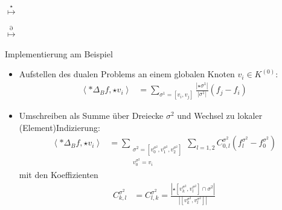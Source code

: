 \documentclass[handout]{beamer}
\begin{document}
\begin{frame}
\begin{overprint}
\begin{minipage}{0.4\textwidth}
            \centering 
          \end{minipage}\hfill
          {\Huge\(\overset{\star}{\longmapsto}\)}  \hfill
          \begin{minipage}{0.4\textwidth}
            \centering 
          \end{minipage}
          \begin{minipage}{0.4\textwidth}
            \centering 
          \end{minipage}\hfill
          {\Huge\(\overset{\partial}{\longmapsto}\)}  \hfill
          \begin{minipage}{0.4\textwidth}
            \centering 
          \end{minipage}
    \end{overprint}
  \end{frame}

  \begin{frame}
    \begin{block}{Implementierung am Beispiel}
      \small
      \begin{itemize}
        \item<1-> Aufstellen des dualen Problems an einem globalen Knoten \( v_{i}\in K^{(0)} \):
            \begin{align*}
              \left\langle *\Delta_{B} f , \star v_{i} \right\rangle
                     &= \sum_{\sigma^{1}=\left[ v_{i}, v_{j} \right]} 
                     \frac{\left| \star\sigma^{1} \right|}{\left| \sigma^{1} \right|}
                      \left( f_{j} - f_{i} \right)
            \end{align*}
        \item<2-> Umschreiben als Summe über Dreiecke \( \sigma^{2} \) und Wechsel zu lokaler (Element)Indizierung:
              \begin{align*}
                \left\langle *\Delta_{B} f , \star v_{i} \right\rangle
                               &= \sum_{\substack{\sigma^{2}=\left[ v^{\sigma^{2}}_{0},v^{\sigma^{2}}_{1},v^{\sigma^{2}}_{2} \right]\\
                                               v^{\sigma^{2}}_{0} = v_{i}}}
                  \sum_{l=1,2} C^{\sigma^{2}}_{0,l} 
                          \left( f^{\sigma^{2}}_{l} -  f^{\sigma^{2}}_{0}\right)
              \end{align*}
              mit den Koeffizienten
              \begin{align*}
               C^{\sigma^{2}}_{k,l} &= C^{\sigma^{2}}_{l,k}
                            = \frac{\left| \star \left[ v^{\sigma^{2}}_{k}, v^{\sigma^{2}}_{l} \right] 
                                            \cap \sigma^{2}\right|}
                                   {\left| \left[ v^{\sigma^{2}}_{k}, v^{\sigma^{2}}_{l} \right] \right|}
              \end{align*}
      \end{itemize}
    \end{block}
  \end{frame}
\end{document}
